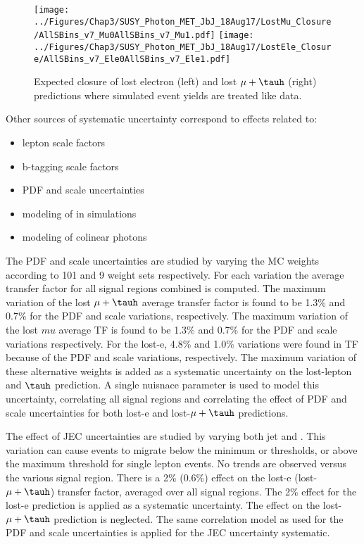 \begin{figure}
\centering
\texttt{[image: ../Figures/Chap3/SUSY\_Photon\_MET\_JbJ\_18Aug17/LostMu\_Closure/AllSBins\_v7\_Mu0AllSBins\_v7\_Mu1.pdf]}
\texttt{[image: ../Figures/Chap3/SUSY\_Photon\_MET\_JbJ\_18Aug17/LostEle\_Closure/AllSBins\_v7\_Ele0AllSBins\_v7\_Ele1.pdf]}
\captionsetup{width=.9\linewidth}
\caption{Expected closure of lost electron (left) and lost $\mu+\tauh$ (right) predictions
where simulated event yields are treated like data.}
\label{fig:lost_lepton_closure}
\end{figure}

Other sources of systematic uncertainty correspond to effects related to:
\begin{itemize}
  \item lepton scale factors
  \item b-tagging scale factors
  \item PDF and scale uncertainties
  \item modeling of \mt in simulations
  \item modeling of colinear photons 
\end{itemize}

The PDF and scale uncertainties are studied by varying the MC weights according
to 101 and 9 weight sets respectively.  For each variation the average transfer factor for
all signal regions combined is computed.  
The maximum variation of the lost $\mu+\tauh$
average transfer factor is found to be 1.3\% and 0.7\% for the PDF and scale variations, 
respectively.  
The maximum variation of the lost $mu$ average TF is found to be 1.3\% and 0.7\% for the PDF and scale variations respectively.
For the lost-e, 4.8\% and 1.0\% variations were found in TF because of the PDF and scale variations, respectively.
The maximum variation of these alternative weights is added as a systematic 
uncertainty on the lost-lepton and $\tauh$ prediction. A single nuisnace parameter
is used to model this uncertainty, correlating all signal regions and correlating
the effect of PDF and scale uncertainties for both lost-e and lost-$\mu+\tauh$
predictions. 

The effect of JEC uncertainties are studied by varying both jet \pt and \ptmiss.
This variation can cause events 
to migrate below the minimum \ptmiss or \ST thresholds, or above the maximum
\mt threshold for single lepton events.  No trends are observed versus 
the various signal region.  There is a 2\% (0.6\%) effect on the lost-e (lost-$\mu+\tauh$)
transfer factor, averaged over all signal regions.  The 2\% effect for the lost-e 
prediction is applied as a systematic uncertainty.  The effect on the lost-$\mu+\tauh$
prediction is neglected.
The same correlation model as used for the PDF and scale uncertainties is applied
for the JEC uncertainty systematic.  

